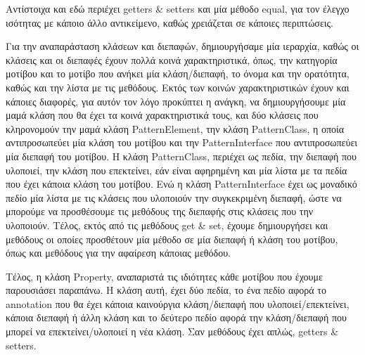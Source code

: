 Αντίστοιχα και εδώ περιέχει getters \& setters και μία μέθοδο equal, για τον έλεγχο ισότητας με κάποιο άλλο αντικείμενο, 
καθώς χρειάζεται σε κάποιες περιπτώσεις.
\par
Για την αναπαράσταση κλάσεων και διεπαφών, δημιουργήσαμε μία ιεραρχία, καθώς οι κλάσεις και οι διεπαφές 
έχουν πολλά κοινά χαρακτηριστικά, όπως, την κατηγορία μοτίβου και το μοτίβο που ανήκει μία κλάση/διεπαφή, το όνομα και την ορατότητα, 
καθώς και την λίστα με τις μεθόδους. Εκτός των κοινών χαρακτηριστικών έχουν και κάποιες διαφορές, για αυτόν τον λόγο προκύπτει η ανάγκη, 
να δημιουργήσουμε μία μαμά κλάση που θα έχει τα κοινά χαρακτηριστικά τους, και δύο κλάσεις που κληρονομούν την μαμά κλάση PatternElement, 
την κλάση PatternClass, η οποία αντιπροσωπεύει μία κλάση του μοτίβου και την PatternInterface που αντιπροσωπεύει μία διεπαφή του μοτίβου. 
Η κλάση PatternClass, περιέχει ως πεδία, την διεπαφή που υλοποιεί, την κλάση που επεκτείνει, εάν είναι αφηρημένη και 
μία λίστα με τα πεδία που έχει κάποια κλάση του μοτίβου. Ενώ η κλάση PatternInterface έχει ως μοναδικό 
πεδίο μία λίστα με τις κλάσεις που υλοποιούν την συγκεκριμένη διεπαφή, ώστε να μπορούμε να προσθέσουμε τις μεθόδους της 
διεπαφής στις κλάσεις που την υλοποιούν. Τέλος, εκτός από τις μεθόδους get \& set, έχουμε δημιουργήσει και μεθόδους 
οι οποίες προσθέτουν μία μέθοδο σε μία διεπαφή ή κλάση του μοτίβου, όπως και μεθόδους για την αφαίρεση κάποιας μεθόδου.
\par
Τέλος, η κλάση Property, αναπαριστά τις ιδιότητες κάθε μοτίβου που έχουμε παρουσιάσει παραπάνω. Η κλάση αυτή, 
έχει δύο πεδία, το ένα πεδίο αφορά το annotation που θα έχει κάποια καινούργια κλάση/διεπαφή που υλοποιεί/επεκτείνει, 
κάποια διεπαφή ή άλλη κλάση και το δεύτερο πεδίο αφορά την κλάση/διεπαφή που μπορεί να επεκτείνει/υλοποιεί η  νέα κλάση. 
Σαν μεθόδους έχει απλώς, getters \& setters.
